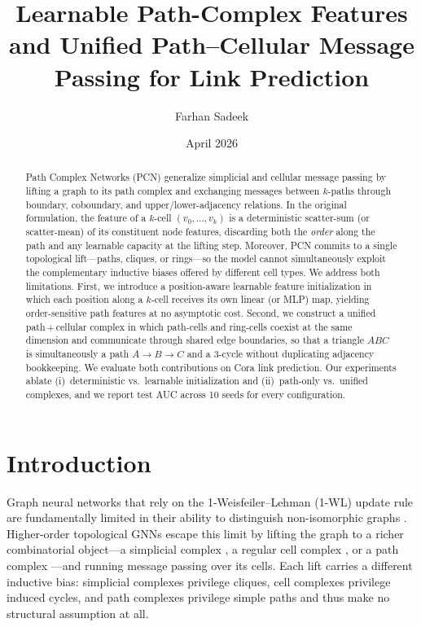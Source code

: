 \documentclass[11pt]{article}
\title{Learnable Path-Complex Features and Unified Path--Cellular Message
Passing for Link Prediction}
\author{Farhan Sadeek}
\affil{Dartmouth College}
\date{April 2026}
\newcommand{\pcn}{\textsc{PCN}}
\begin{document}
\maketitle

\begin{abstract}
  Path Complex Networks (\pcn{}) generalize simplicial and cellular message
  passing by lifting a graph to its path complex and exchanging messages
  between $k$-paths through boundary, coboundary, and upper/lower-adjacency
  relations. In the original formulation, the feature of a $k$-cell
  $(v_0,\ldots,v_k)$ is a deterministic scatter-sum (or scatter-mean) of
  its constituent node features, discarding both the \emph{order} along
  the path and any learnable capacity at the lifting step. Moreover, \pcn{}
  commits to a single topological lift---paths, cliques, or rings---so the
  model cannot simultaneously exploit the complementary inductive biases
  offered by different cell types. We address both limitations. First, we
  introduce a position-aware learnable feature initialization in which
  each position along a $k$-cell receives its own linear (or MLP) map,
  yielding order-sensitive path features at no asymptotic cost. Second,
  we construct a unified path\,+\,cellular complex in which path-cells and
  ring-cells coexist at the same dimension and communicate through shared
  edge boundaries, so that a triangle $ABC$ is simultaneously a path
  $A{\to}B{\to}C$ and a 3-cycle without duplicating adjacency bookkeeping.
  We evaluate both contributions on Cora link prediction. Our experiments
  ablate (i)~deterministic vs.\ learnable initialization and (ii)~path-only
  vs.\ unified complexes, and we report test AUC across 10 seeds for every
  configuration.
\end{abstract}

\section{Introduction}

Graph neural networks that rely on the 1-Weisfeiler--Lehman (1-WL)
update rule are fundamentally limited in their ability to distinguish
non-isomorphic graphs \citep{xu2019powerful}. Higher-order topological
GNNs escape this limit by lifting the graph to a richer combinatorial
object---a simplicial complex \citep{bodnar2021mpsn}, a regular cell
complex \citep{bodnar2021cwn}, or a path complex
\citep{truong2024pcn}---and running message passing over its cells.
Each lift carries a different inductive bias: simplicial complexes
privilege cliques, cell complexes privilege induced cycles, and path
complexes privilege simple paths and thus make no structural
assumption at all.
\end{document}
